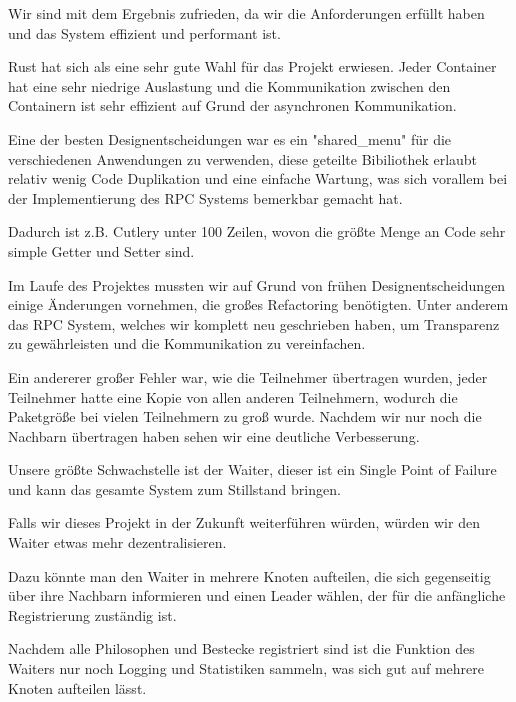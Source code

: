 Wir sind mit dem Ergebnis zufrieden, da wir die Anforderungen erfüllt haben und das System effizient und performant ist.

Rust hat sich als eine sehr gute Wahl für das Projekt erwiesen. Jeder Container hat eine sehr niedrige Auslastung und die Kommunikation zwischen den Containern ist sehr effizient 
auf Grund der asynchronen Kommunikation.

Eine der besten Designentscheidungen war es ein "shared_menu" für die verschiedenen Anwendungen zu verwenden,
diese geteilte Bibiliothek erlaubt relativ wenig Code Duplikation und eine einfache Wartung, was sich vorallem bei der Implementierung des RPC Systems bemerkbar gemacht hat.

Dadurch ist z.B. Cutlery unter 100 Zeilen, wovon die größte Menge an Code sehr simple Getter und Setter sind.

Im Laufe des Projektes mussten wir auf Grund von frühen Designentscheidungen einige Änderungen vornehmen, die großes Refactoring benötigten.
Unter anderem das RPC System, welches wir komplett neu geschrieben haben, um Transparenz zu gewährleisten und die Kommunikation zu vereinfachen.

Ein andererer großer Fehler war, wie die Teilnehmer übertragen wurden, 
jeder Teilnehmer hatte eine Kopie von allen anderen Teilnehmern, wodurch die Paketgröße bei vielen Teilnehmern zu groß wurde. 
Nachdem wir nur noch die Nachbarn übertragen haben sehen wir eine deutliche Verbesserung.

Unsere größte Schwachstelle ist der Waiter, dieser ist ein Single Point of Failure und kann das gesamte System zum Stillstand bringen.

Falls wir dieses Projekt in der Zukunft weiterführen würden, würden wir den Waiter etwas mehr dezentralisieren. 

Dazu könnte man den Waiter in mehrere Knoten aufteilen, die sich gegenseitig über ihre Nachbarn informieren
und einen Leader wählen, der für die anfängliche Registrierung zuständig ist.

Nachdem alle Philosophen und Bestecke registriert sind ist die Funktion des Waiters nur noch Logging und Statistiken sammeln, 
was sich gut auf mehrere Knoten aufteilen lässt.